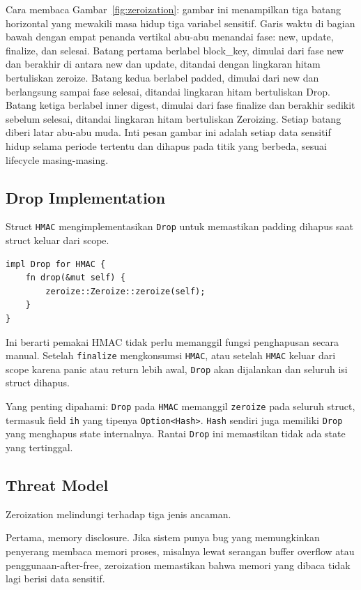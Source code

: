 \documentclass[11pt,a4paper]{article}
\begin{document}
Cara membaca Gambar~\ref{fig:zeroization}: gambar ini menampilkan tiga batang horizontal yang mewakili masa hidup tiga variabel sensitif. Garis waktu di bagian bawah dengan empat penanda vertikal abu-abu menandai fase: new, update, finalize, dan selesai. Batang pertama berlabel block\_key, dimulai dari fase new dan berakhir di antara new dan update, ditandai dengan lingkaran hitam bertuliskan zeroize. Batang kedua berlabel padded, dimulai dari new dan berlangsung sampai fase selesai, ditandai lingkaran hitam bertuliskan Drop. Batang ketiga berlabel inner digest, dimulai dari fase finalize dan berakhir sedikit sebelum selesai, ditandai lingkaran hitam bertuliskan Zeroizing. Setiap batang diberi latar abu-abu muda. Inti pesan gambar ini adalah setiap data sensitif hidup selama periode tertentu dan dihapus pada titik yang berbeda, sesuai lifecycle masing-masing.

\subsection{Drop Implementation}

Struct \texttt{HMAC} mengimplementasikan \texttt{Drop} untuk memastikan padding dihapus saat struct keluar dari scope.

\begin{lstlisting}[style=code]
impl Drop for HMAC {
    fn drop(&mut self) {
        zeroize::Zeroize::zeroize(self);
    }
}
\end{lstlisting}

Ini berarti pemakai HMAC tidak perlu memanggil fungsi penghapusan secara manual. Setelah \texttt{finalize} mengkonsumsi \texttt{HMAC}, atau setelah \texttt{HMAC} keluar dari scope karena panic atau return lebih awal, \texttt{Drop} akan dijalankan dan seluruh isi struct dihapus.

Yang penting dipahami: \texttt{Drop} pada \texttt{HMAC} memanggil \texttt{zeroize} pada seluruh struct, termasuk field \texttt{ih} yang tipenya \texttt{Option<Hash>}. \texttt{Hash} sendiri juga memiliki \texttt{Drop} yang menghapus state internalnya. Rantai \texttt{Drop} ini memastikan tidak ada state yang tertinggal.

\subsection{Threat Model}

Zeroization melindungi terhadap tiga jenis ancaman.

Pertama, memory disclosure. Jika sistem punya bug yang memungkinkan penyerang membaca memori proses, misalnya lewat serangan buffer overflow atau penggunaan-after-free, zeroization memastikan bahwa memori yang dibaca tidak lagi berisi data sensitif.
\end{document}
